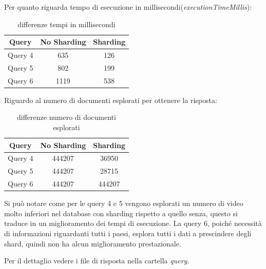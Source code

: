\documentclass[10pt, a4paper,openany]{article}
\begin{document}
	Per quanto riguarda tempo di esecuzione in millisecondi(\textit{executionTimeMillis}):
	\begin{table}[H]
		\centering
		\begin{tabular}{c|c|c}
			\textbf{Query} & \textbf{No Sharding} & \textbf{Sharding} \\
			\hline
			Query 4 & 635 & 126 \\
			Query 5 & 802 & 199 \\
			Query 6 & 1119 & 538 
		\end{tabular}
		\caption{differenze tempi in millisecondi}
	\end{table}
	
	Riguardo al numero di documenti esplorati per ottenere la risposta:
	\begin{table}[H]
		\centering
		\begin{tabular}{c|c|c}
			\textbf{Query} & \textbf{No Sharding} & \textbf{Sharding} \\
			\hline
			Query 4 & 444207 & 36950 \\
			Query 5 & 444207 & 28715 \\
			Query 6 & 444207 & 444207 
		\end{tabular}
		\caption{differenze numero di documenti esplorati}
	\end{table}
	
	Si può notare come per le query 4 e 5 vengono esplorati un numero di video molto inferiori nel database con sharding rispetto a quello senza, questo si traduce in un miglioramento dei tempi di esecuzione. La query 6, poiché necessità di informazioni riguardanti tutti i paesi, esplora tutti i dati a prescindere degli shard, quindi non ha alcun miglioramento prestazionale.
	
	Per il dettaglio vedere i file di risposta nella cartella \textit{query}.

\end{document}
